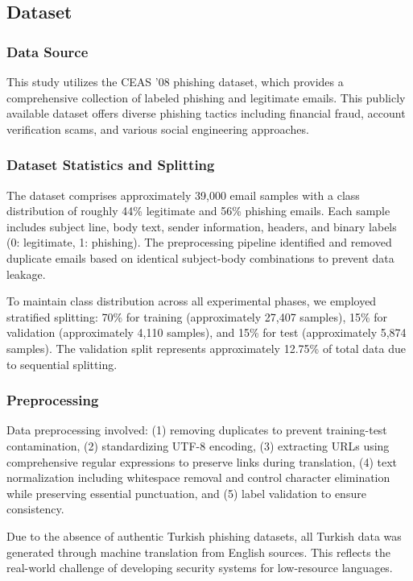\documentclass[conference]{IEEEtran}
\begin{document}
\subsection{Dataset}

\subsubsection{Data Source}
This study utilizes the CEAS '08 phishing dataset, which provides a comprehensive collection of labeled phishing and legitimate emails. This publicly available dataset offers diverse phishing tactics including financial fraud, account verification scams, and various social engineering approaches.

\subsubsection{Dataset Statistics and Splitting}
The dataset comprises approximately 39,000 email samples with a class distribution of roughly 44\% legitimate and 56\% phishing emails. Each sample includes subject line, body text, sender information, headers, and binary labels (0: legitimate, 1: phishing). The preprocessing pipeline identified and removed duplicate emails based on identical subject-body combinations to prevent data leakage.

To maintain class distribution across all experimental phases, we employed stratified splitting: 70\% for training (approximately 27,407 samples), 15\% for validation (approximately 4,110 samples), and 15\% for test (approximately 5,874 samples). The validation split represents approximately 12.75\% of total data due to sequential splitting.

\subsubsection{Preprocessing}
Data preprocessing involved: (1) removing duplicates to prevent training-test contamination, (2) standardizing UTF-8 encoding, (3) extracting URLs using comprehensive regular expressions to preserve links during translation, (4) text normalization including whitespace removal and control character elimination while preserving essential punctuation, and (5) label validation to ensure consistency.

Due to the absence of authentic Turkish phishing datasets, all Turkish data was generated through machine translation from English sources. This reflects the real-world challenge of developing security systems for low-resource languages.
\end{document}
